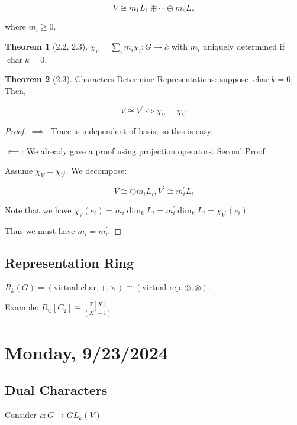 \documentclass{article}
\theoremstyle{definition}
\newtheorem{theorem}{Theorem}
\newcommand{\Char}{\operatorname{char}}
\begin{document}
\[
    V \cong m_1 L_1 \oplus \cdots \oplus m_s L_s
\]

where \(m_i \geq 0\).

\begin{theorem}
    [2.2, 2.3] \(\chi _v = \sum_{i} m_i \chi_i : G \to k\) with \(m_i\) uniquely determined if \(\Char k = 0\).
\end{theorem}

\begin{theorem}
    [2.3] Characters Determine Representations: suppose \(\Char k = 0\). Then,

    \[
        V \cong V^{\prime} \iff \chi_V = \chi_{V^{\prime} }
    \]
\end{theorem}

\begin{proof}
    \(\implies\): Trace is independent of basis, so this is easy.

    \(\impliedby\): We already gave a proof using projection operators. Second Proof:

    Assume \(\chi_V = \chi _{V^{\prime}}\). We decompose:

    \[
        V \cong \oplus m_i L_i, V^{\prime} \cong m_i^{\prime} L_i
    \]

    Note that we have \(\chi_V(e_i) = m_i \dim_k L_i = m_i^{\prime} \dim_k L_i = \chi_{V^{\prime}}(e_i)\)
    
    Thus we must have \(m_i = m_i^{\prime}\).
\end{proof}

\subsection*{Representation Ring}

\(R_k(G) = (\text{virtual char},+,\times) \cong (\text{virtual rep}, \oplus, \otimes)\).

Example: \(R_{\mathbb{Q}}[C_2] \cong \frac{\mathbb{Z}[X]}{(X^2 - 1)}\) 


\section*{Monday, 9/23/2024}

\subsection*{Dual Characters}



Consider \(\rho : G \to GL_k(V)\) 
\end{document}

